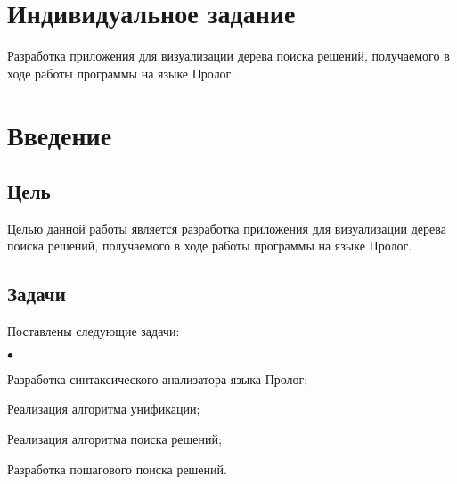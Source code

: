 \chapter{Индивидуальное задание}
Разработка приложения для визуализации дерева поиска решений, получаемого в ходе работы программы на языке Пролог.


\chapter{Введение}
\section{Цель}
Целью данной работы является разработка приложения для визуализации дерева поиска решений, получаемого в ходе работы программы на языке Пролог.
\section{Задачи}
Поставлены следующие задачи:
\begin{list}{$\bullet$}{}
	\item Разработка синтаксического анализатора языка Пролог;
	\item Реализация алгоритма унификации;
	\item Реализация алгоритма поиска решений;
	\item Разработка пошагового поиска решений.
\end{list}
